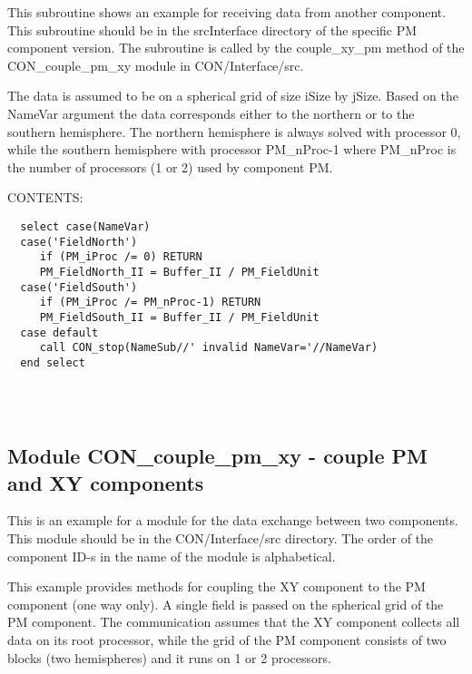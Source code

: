      This subroutine shows an example for receiving data from another component.
     This subroutine should be in the srcInterface directory of the 
     specific PM component version. The subroutine is called by the
     couple\_xy\_pm method of the CON\_couple\_pm\_xy module in
     CON/Interface/src.
     
     The data is assumed to be on a spherical grid of size iSize by jSize.
     Based on the NameVar argument the data corresponds either to the 
     northern or to the southern hemisphere. The northern hemisphere is
     always solved with processor 0, while the southern hemisphere with 
     processor PM\_nProc-1 where PM\_nProc is the number of processors (1 or 2)
     used by component PM.


\bigskip
{\sf CONTENTS:}
\begin{verbatim}
  select case(NameVar)
  case('FieldNorth')
     if (PM_iProc /= 0) RETURN
     PM_FieldNorth_II = Buffer_II / PM_FieldUnit
  case('FieldSouth')
     if (PM_iProc /= PM_nProc-1) RETURN
     PM_FieldSouth_II = Buffer_II / PM_FieldUnit
  case default
     call CON_stop(NameSub//' invalid NameVar='//NameVar)
  end select
 
\end{verbatim}
 
 
\mbox{}\hrulefill\ 
 
\newpage


\subsection{Module  CON\_couple\_pm\_xy - couple PM and XY components }


   
   This is an example for a module for the data exchange between two
   components. This module should be in the CON/Interface/src directory.
   The order of the component ID-s in the name of the module is alphabetical.
  
   This example provides methods for coupling the XY component to the PM 
   component (one way only). A single field is passed on the spherical 
   grid of the PM component. The communication assumes that the XY component 
   collects all data on its root processor, while the grid of the PM component
   consists of two blocks (two hemispheres) and it runs on 1 or 2 processors.
  
